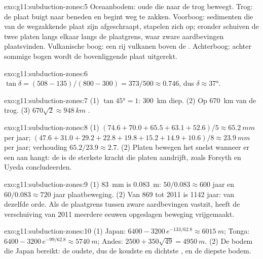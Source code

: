 \begin{solution}{exo:g11:subduction-zones:5}
Oceaanbodem: oude  die naar de trog beweegt. Trog: de plaat buigt
naar beneden en begint weg te zakken. Voorboog: sedimenten die van de wegzakkende plaat
zijn afgeschraapt, stapelen zich op; eronder schuiven de twee platen langs elkaar langs de plaatgrens,
waar zware aardbevingen plaatsvinden. Vulkanische boog: een rij vulkanen boven de
. Achterboog: achter sommige bogen wordt de bovenliggende plaat uitgerekt.
\end{solution}

\begin{solution}{exo:g11:subduction-zones:6}
$\tan\delta = (508 - 135)/(800 - 300) = 373/500 \approx 0.746$, dus
$\delta \approx \ang{37}$.
\end{solution}

\begin{solution}{exo:g11:subduction-zones:7}
(1) $\tan\ang{45} = 1$: \qty{300}{km} diep. (2) Op \qty{670}{km} van de
trog. (3) $670\sqrt{2} \approx \qty{948}{km}$ .
\end{solution}

\begin{solution}{exo:g11:subduction-zones:8}
(1) $(74.6 + 70.0 + 65.5 + 63.1 + 52.6)/5 \approx \qty{65.2}{mm}$ per jaar;
$(47.6 + 31.0 + 29.2 + 22.8 + 19.8 + 15.2 + 14.9 + 10.6)/8 \approx
\qty{23.9}{mm}$ per jaar; verhouding $65.2/23.9 \approx 2.7$. (2) Platen bewegen
het snelst wanneer er een  aan hangt: de  is de
sterkste kracht die platen aandrijft, zoals Forsyth en Uyeda concludeerden.
\end{solution}

\begin{solution}{exo:g11:subduction-zones:9}
(1) \qty{83}{mm} is \qty{0.083}{m}: $50/0.083 \approx 600$ jaar en
$60/0.083 \approx 720$ jaar plaatbeweging. (2) Van 869 tot 2011 is 1142
jaar: van dezelfde orde. Als de plaatgrens tussen zware aardbevingen vastzit,
heeft de verschuiving van 2011 meerdere eeuwen opgeslagen beweging vrijgemaakt.
\end{solution}

\begin{solution}{exo:g11:subduction-zones:10}
(1) Japan: $6400 - 3200\,e^{-133/62.8} \approx \qty{6015}{m}$; Tonga:
$6400 - 3200\,e^{-99/62.8} \approx \qty{5740}{m}$; Andes:
$2500 + 350\sqrt{49} = \qty{4950}{m}$. (2) De bodem die Japan bereikt: de
oudste, dus de koudste en dichtste , en de diepste bodem.
\end{solution}

